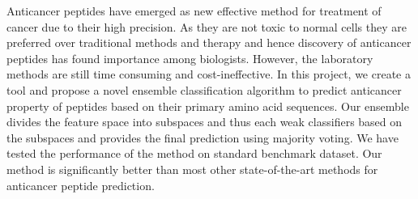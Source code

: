 \begin{abstracts}
Anticancer peptides have emerged as new effective method for treatment of cancer due to their high precision. As they are not toxic to normal cells they are preferred over traditional methods and therapy and hence discovery of anticancer peptides has found importance among biologists. However, the laboratory methods are still time consuming and cost-ineffective. In this project, we create a tool and propose a novel ensemble classification algorithm to predict anticancer property of peptides based on their primary amino acid sequences. Our ensemble divides the feature space into subspaces and thus each weak classifiers based on the subspaces and provides the final prediction using majority voting. We have tested the performance of the method on standard benchmark dataset. Our method is significantly better than most other state-of-the-art methods for anticancer peptide prediction.

\end{abstracts}
